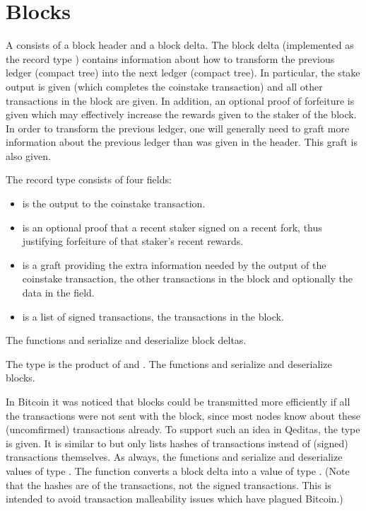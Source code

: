 \section{Blocks}

A {} consists of a block header and a block delta.
The block delta (implemented as the record type {})
contains information about how to transform the previous ledger (compact tree)
into the next ledger (compact tree).
In particular, the stake output is given (which completes the coinstake transaction)
and all other transactions in the block are given.
In addition, an optional proof of forfeiture is given which may effectively increase
the rewards given to the staker of the block.
In order to transform the previous ledger,
one will generally need to graft more information about the previous
ledger than was given in the header.
This graft is also given.

The {} record type consists of four fields:
\begin{itemize}
\item {} is the output to the coinstake transaction.
\item {} is an optional proof that a recent staker signed on a recent fork, thus
justifying forfeiture of that staker's recent rewards.
\item {} is a graft providing the extra information needed by the output of the coinstake transaction, the other transactions in the block and optionally the data in the {} field.
\item {} is a list of signed transactions, the transactions in the block.
\end{itemize}
The functions {} and {} serialize
and deserialize block deltas.

The type {} is the product of {} and {}.
The functions {} and {} serialize
and deserialize blocks.

In Bitcoin it was noticed that blocks could be transmitted more efficiently
if all the transactions were not sent with the block, since most nodes know
about these (uncomfirmed) transactions already.
To support such an idea in Qeditas, the type {}
is given. It is similar to {} but only lists hashes of transactions
instead of (signed) transactions themselves.
As always, the functions {} and
{} serialize and deserialize values of type {}.
The function {} converts a block delta into a
value of type {}. (Note that the hashes are of the transactions,
not the signed transactions. This is intended to avoid transaction malleability issues
which have plagued Bitcoin.)

